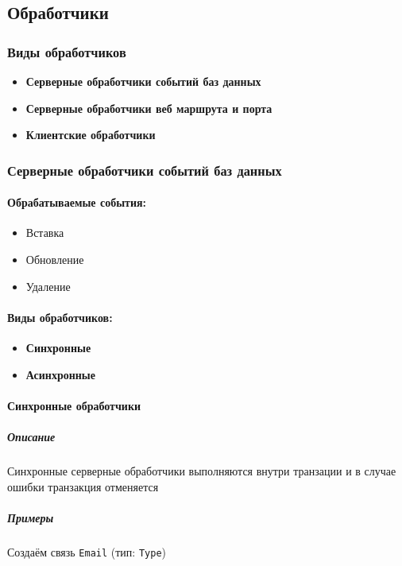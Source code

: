 \documentclass{article}
\begin{document}
\subsection{Обработчики}

\subsubsection{Виды обработчиков}
\begin{itemize}
    \item \textbf{Серверные обработчики событий баз данных}
    \item \textbf{Серверные обработчики веб маршрута и порта}
    \item \textbf{Клиентские обработчики}
\end{itemize}



\subsubsection{Серверные обработчики событий баз данных}
\paragraph{Обрабатываемые события:}
\begin{itemize}
  \item Вставка
  \item Обновление
  \item Удаление
\end{itemize}
\paragraph{Виды обработчиков:}
\begin{itemize}
    \item \textbf{Синхронные}
    \item \textbf{Асинхронные}
\end{itemize}

\paragraph{Синхронные обработчики}
\subparagraph{Описание}

Синхронные серверные обработчики выполняются внутри транзации и в случае ошибки транзакция отменяется
\subparagraph{Примеры}

Создаём связь \texttt{Email} (тип: \texttt{Type}) 
\end{document}
